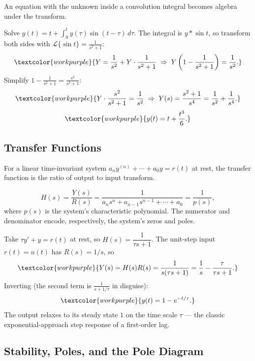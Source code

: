 An equation with the unknown inside a convolution integral becomes algebra under the
transform.

\begin{examplebox}
Solve $y(t) = t + \displaystyle\int_0^t y(\tau)\sin(t-\tau)\,d\tau$. The integral is
$y * \sin t$, so transform both sides with $\mathcal{L}\{\sin t\}=\frac{1}{s^2+1}$:
\[ \textcolor{workpurple}{Y = \frac{1}{s^2} + Y\cdot\frac{1}{s^2+1}
   \;\Rightarrow\; Y\left(1 - \frac{1}{s^2+1}\right) = \frac{1}{s^2}.} \]
Simplify $1-\frac{1}{s^2+1} = \frac{s^2}{s^2+1}$:
\[ \textcolor{workpurple}{Y\cdot\frac{s^2}{s^2+1} = \frac{1}{s^2}
   \;\Rightarrow\; Y(s) = \frac{s^2+1}{s^4} = \frac{1}{s^2} + \frac{1}{s^4}.} \]
\[ \textcolor{workpurple}{y(t) = t + \frac{t^3}{6}.} \]
\end{examplebox}

\subsection{Transfer Functions}

For a linear time-invariant system $a_n y^{(n)}+\cdots+a_0 y = r(t)$ at rest, the
transfer function is the ratio of output to input transform.

\begin{formulabox}
\[ H(s) = \frac{Y(s)}{R(s)} = \frac{1}{a_n s^n + a_{n-1}s^{n-1} + \cdots + a_0}
   = \frac{1}{p(s)}, \]
where $p(s)$ is the system's characteristic polynomial. The numerator and denominator
encode, respectively, the system's zeros and poles.
\end{formulabox}

\begin{examplebox}
Take $\tau y' + y = r(t)$ at rest, so $H(s) = \dfrac{1}{\tau s + 1}$. The unit-step
input $r(t)=u(t)$ has $R(s)=1/s$, so
\[ \textcolor{workpurple}{Y(s) = H(s)R(s) = \frac{1}{s(\tau s + 1)}
   = \frac{1}{s} - \frac{\tau}{\tau s + 1}.} \]
Inverting (the second term is $\frac{1}{s + 1/\tau}$ in disguise):
\[ \textcolor{workpurple}{y(t) = 1 - e^{-t/\tau}.} \]
The output relaxes to its steady state $1$ on the time scale $\tau$ --- the classic
exponential-approach step response of a first-order lag.
\end{examplebox}

\subsection{Stability, Poles, and the Pole Diagram}

